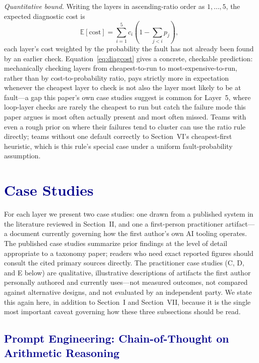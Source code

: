 \documentclass[journal]{IEEEtran}
\begin{document}
\emph{Quantitative bound.} Writing the layers in ascending-ratio order as $1,\ldots,5$, the expected diagnostic cost is
\begin{equation}
\mathbb{E}[\text{cost}] = \sum_{i=1}^{5} c_i \left(1 - \sum_{j<i} p_j\right),
\label{eq:diagcost}
\end{equation}
each layer's cost weighted by the probability the fault has not already been found by an earlier check. Equation~\eqref{eq:diagcost} gives a concrete, checkable prediction: mechanically checking layers from cheapest-to-run to most-expensive-to-run, rather than by cost-to-probability ratio, pays strictly more in expectation whenever the cheapest layer to check is not also the layer most likely to be at fault---a gap this paper's own case studies suggest is common for Layer~5, where loop-layer checks are rarely the cheapest to run but catch the failure mode this paper argues is most often actually present and most often missed. Teams with even a rough prior on where their failures tend to cluster can use the ratio rule directly; teams without one default correctly to Section~VI's cheapest-first heuristic, which is this rule's special case under a uniform fault-probability assumption.

\section{\textcolor{darkblue}{Case Studies}}

For each layer we present two case studies: one drawn from a published system in the literature reviewed in Section~II, and one a first-person practitioner artifact---a document currently governing how the first author's own AI tooling operates. The published case studies summarize prior findings at the level of detail appropriate to a taxonomy paper; readers who need exact reported figures should consult the cited primary sources directly. The practitioner case studies (C, D, and E below) are qualitative, illustrative descriptions of artifacts the first author personally authored and currently uses---not measured outcomes, not compared against alternative designs, and not evaluated by an independent party. We state this again here, in addition to Section~I and Section~VII, because it is the single most important caveat governing how these three subsections should be read.

\subsection{\textcolor{darkblue}{Prompt Engineering: Chain-of-Thought on Arithmetic Reasoning}}
\end{document}
